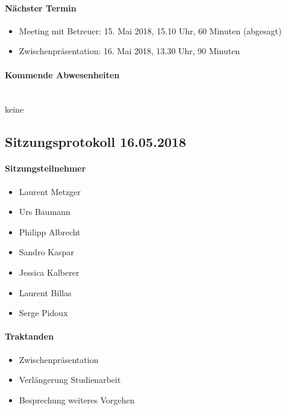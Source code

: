 \paragraph{Nächster Termin}
\begin{itemize}	
	\item Meeting mit Betreuer: 15. Mai 2018, 15.10 Uhr, 60 Minuten (abgesagt)
	\item Zwischenpräsentation: 16. Mai 2018, 13.30 Uhr, 90 Minuten
\end{itemize}

\paragraph{Kommende Abwesenheiten} \mbox{}\\
keine

\newpage


\subsection{Sitzungsprotokoll 16.05.2018}

\paragraph{Sitzungsteilnehmer}
\begin{itemize}	
	\item Laurent Metzger 
	\item Urs Baumann
	\item Philipp Albrecht
	\item Sandro Kaspar
	\item Jessica Kalberer
	\item Laurent Billas 
	\item Serge Pidoux 
\end{itemize}

\paragraph{Traktanden}
\begin{itemize}	
	\item Zwischenpräsentation
	\item Verlängerung Studienarbeit
	\item Besprechung weiteres Vorgehen
\end{itemize}

